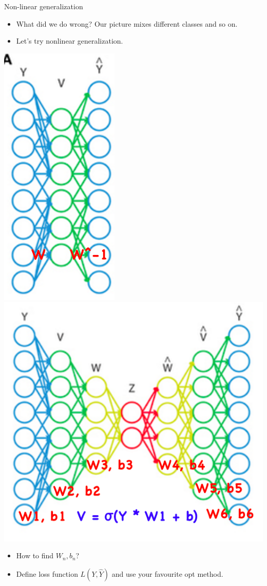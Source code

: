 \documentclass{beamer}
\begin{document}
\begin{frame}{Non-linear generalization}
	\begin{itemize}
		 \item What did we do wrong? Our picture mixes different classes and so on.
		 \item Let's try nonlinear generalization.
	\end{itemize}
	
	 \begin{center}
	 	 \includegraphics[scale=0.3]{img/fcautoenc1} ~~~ \includegraphics[scale=0.25]{img/fcautoenc2}		 
	 \end{center}
	
	\begin{itemize}
		 \item How to find $W_n, b_n$? 
		 \item Define loss function $L(Y, \hat{Y})$ and  use your favourite opt method.
	\end{itemize}
\end{frame}
\end{document}
